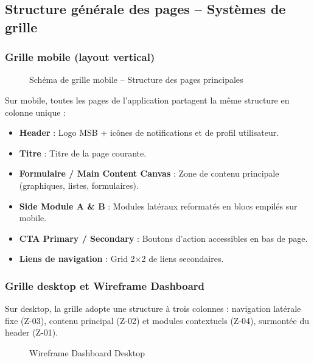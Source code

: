 \subsection{Structure générale des pages -- Systèmes de grille}

\subsubsection{Grille mobile (layout vertical)}

\begin{figure}[H]
    \centering
    \caption{Schéma de grille mobile -- Structure des pages principales}
    \label{fig:wireframe-mobile-layout}
\end{figure}

Sur mobile, toutes les pages de l'application partagent la même structure en colonne unique :
\begin{itemize}
    \item \textbf{Header} : Logo MSB + icônes de notifications et de profil utilisateur.
    \item \textbf{Titre} : Titre de la page courante.
    \item \textbf{Formulaire / Main Content Canvas} : Zone de contenu principale (graphiques, listes, formulaires).
    \item \textbf{Side Module A \& B} : Modules latéraux reformatés en blocs empilés sur mobile.
    \item \textbf{CTA Primary / Secondary} : Boutons d'action accessibles en bas de page.
    \item \textbf{Liens de navigation} : Grid 2×2 de liens secondaires.
\end{itemize}

\subsubsection{Grille desktop et Wireframe Dashboard}

Sur desktop, la grille adopte une structure à trois colonnes : navigation latérale fixe (Z-03), contenu principal (Z-02) et modules contextuels (Z-04), surmontée du header (Z-01).

\begin{figure}[H]
    \centering
    \begin{minipage}{0.48\textwidth}
        \centering
        \caption{Zoning desktop -- Structure multi-colonnes}
        \label{fig:zoning-desktop}
    \end{minipage}\hfill
    \begin{minipage}{0.48\textwidth}
        \centering
        \caption{Wireframe Dashboard Desktop}
        \label{fig:wireframe-dashboard-desktop}
    \end{minipage}
\end{figure}

